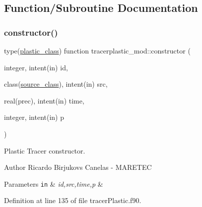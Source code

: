 \subsection{Function/\+Subroutine Documentation}
\mbox{\label{namespacetracerplastic__mod_ae68444b860b6e7abf3940b0ee1bfe57a}} 
\subsubsection{\texorpdfstring{constructor()}{constructor()}}
{\footnotesize\ttfamily type(\mbox{\hyperlink{structtracerplastic__mod_1_1plastic__class}{plastic\+\_\+class}}) function tracerplastic\+\_\+mod\+::constructor (\begin{DoxyParamCaption}\item[{integer, intent(in)}]{id,  }\item[{class(\mbox{\hyperlink{structsources__mod_1_1source__class}{source\+\_\+class}}), intent(in)}]{src,  }\item[{real(prec), intent(in)}]{time,  }\item[{integer, intent(in)}]{p }\end{DoxyParamCaption})\hspace{0.3cm}{\ttfamily [private]}}



Plastic Tracer constructor. 

\begin{DoxyAuthor}{Author}
Ricardo Birjukovs Canelas -\/ M\+A\+R\+E\+T\+EC 
\end{DoxyAuthor}

\begin{DoxyParams}[1]{Parameters}
\mbox{\tt in}  & {\em id,src,time,p} & \\
\hline
\end{DoxyParams}


Definition at line 135 of file tracer\+Plastic.\+f90.


